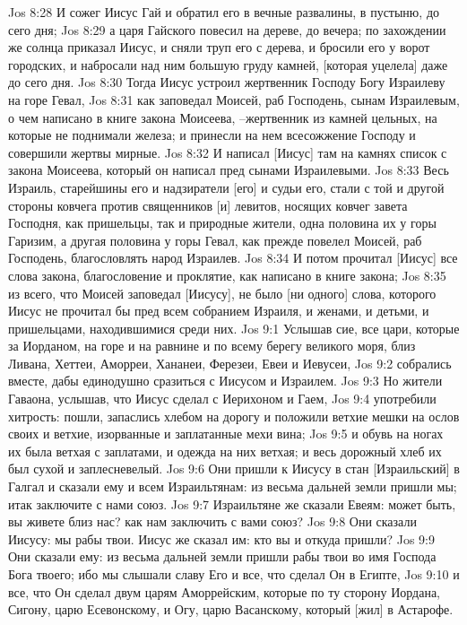Jos 8:28  И сожег Иисус Гай и обратил его в вечные развалины, в пустыню, до сего дня;
Jos 8:29  а царя Гайского повесил на дереве, до вечера; по захождении же солнца приказал Иисус, и сняли труп его с дерева, и бросили его у ворот городских, и набросали над ним большую груду камней, [которая уцелела] даже до сего дня.
Jos 8:30  Тогда Иисус устроил жертвенник Господу Богу Израилеву на горе Гевал,
Jos 8:31  как заповедал Моисей, раб Господень, сынам Израилевым, о чем написано в книге закона Моисеева, --жертвенник из камней цельных, на которые не поднимали железа; и принесли на нем всесожжение Господу и совершили жертвы мирные.
Jos 8:32  И написал [Иисус] там на камнях список с закона Моисеева, который он написал пред сынами Израилевыми.
Jos 8:33  Весь Израиль, старейшины его и надзиратели [его] и судьи его, стали с той и другой стороны ковчега против священников [и] левитов, носящих ковчег завета Господня, как пришельцы, так и природные жители, одна половина их у горы Гаризим, а другая половина у горы Гевал, как прежде повелел Моисей, раб Господень, благословлять народ Израилев.
Jos 8:34  И потом прочитал [Иисус] все слова закона, благословение и проклятие, как написано в книге закона;
Jos 8:35  из всего, что Моисей заповедал [Иисусу], не было [ни одного] слова, которого Иисус не прочитал бы пред всем собранием Израиля, и женами, и детьми, и пришельцами, находившимися среди них.
Jos 9:1  Услышав сие, все цари, которые за Иорданом, на горе и на равнине и по всему берегу великого моря, близ Ливана, Хеттеи, Аморреи, Хананеи, Ферезеи, Евеи и Иевусеи,
Jos 9:2  собрались вместе, дабы единодушно сразиться с Иисусом и Израилем.
Jos 9:3  Но жители Гаваона, услышав, что Иисус сделал с Иерихоном и Гаем,
Jos 9:4  употребили хитрость: пошли, запаслись хлебом на дорогу и положили ветхие мешки на ослов своих и ветхие, изорванные и заплатанные мехи вина;
Jos 9:5  и обувь на ногах их была ветхая с заплатами, и одежда на них ветхая; и весь дорожный хлеб их был сухой и заплесневелый.
Jos 9:6  Они пришли к Иисусу в стан [Израильский] в Галгал и сказали ему и всем Израильтянам: из весьма дальней земли пришли мы; итак заключите с нами союз.
Jos 9:7  Израильтяне же сказали Евеям: может быть, вы живете близ нас? как нам заключить с вами союз?
Jos 9:8  Они сказали Иисусу: мы рабы твои. Иисус же сказал им: кто вы и откуда пришли?
Jos 9:9  Они сказали ему: из весьма дальней земли пришли рабы твои во имя Господа Бога твоего; ибо мы слышали славу Его и все, что сделал Он в Египте,
Jos 9:10  и все, что Он сделал двум царям Аморрейским, которые по ту сторону Иордана, Сигону, царю Есевонскому, и Огу, царю Васанскому, который [жил] в Астарофе.
